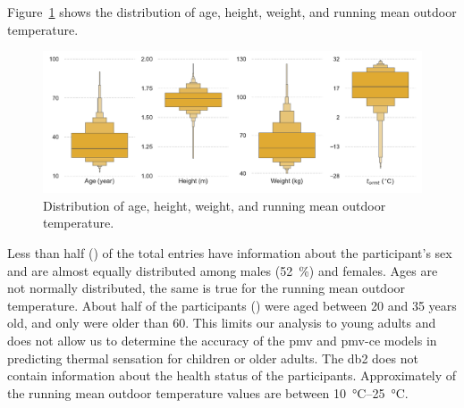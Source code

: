 Figure~\ref{fig:dist_other_data} shows the distribution of age, height, weight, and running mean outdoor temperature.
\begin{figure}[htb!]
    \centering
    \includegraphics[width=\textwidth]{figures/dist_other_data}
    \caption{Distribution of age, height, weight, and running mean outdoor temperature.}
    \label{fig:dist_other_data}
\end{figure}
Less than half () of the total entries have information about the participant's sex and are almost equally distributed among males (\qty{52}{\percent}) and females.
Ages are not normally distributed, the same is true for the running mean outdoor temperature.
About half of the participants () were aged between \num{20} and \num{35} years old, and only  were older than 60.
This limits our analysis to young adults and does not allow us to determine the accuracy of the \ac{pmv} and \ac{pmv-ce} models in predicting thermal sensation for children or older adults.
The \ac{db2} does not contain information about the health status of the participants.
Approximately  of the running mean outdoor temperature values are between \qtyrange{10}{25}{\celsius}.

